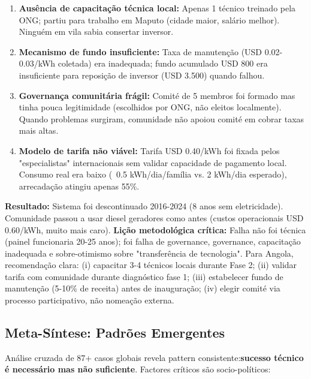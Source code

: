 \documentclass[12pt, a4paper]{article}
\begin{document}
\begin{enumerate}
\item\textbf{Ausência de capacitação técnica local:} Apenas 1 técnico treinado pela ONG; partiu para trabalho em Maputo (cidade maior, salário melhor). Ninguém em vila sabia consertar inversor.
\item\textbf{Mecanismo de fundo insuficiente:} Taxa de manutenção (USD 0.02-0.03/kWh coletada) era inadequada; fundo acumulado USD 800 era insuficiente para reposição de inversor (USD 3.500) quando falhou.
\item\textbf{Governança comunitária frágil:} Comité de 5 membros foi formado mas tinha pouca legitimidade (escolhidos por ONG, não eleitos localmente). Quando problemas surgiram, comunidade não apoiou comité em cobrar taxas mais altas.
\item\textbf{Modelo de tarifa não viável:} Tarifa USD 0.40/kWh foi fixada pelos "especialistas" internacionais sem validar capacidade de pagamento local. Consumo real era baixo (~0.5 kWh/dia/família vs. 2 kWh/dia esperado), arrecadação atingiu apenas 55\%.
\end{enumerate}
\textbf{Resultado:} Sistema foi descontinuado 2016-2024 (8 anos sem eletricidade). Comunidade passou a usar diesel geradores como antes (custos operacionais USD 0.60/kWh, muito mais caro).
\textbf{Lição metodológica crítica:} Falha não foi técnica (painel funcionaria 20-25 anos); foi falha de governance, governance, capacitação inadequada e sobre-otimismo sobre "transferência de tecnologia". Para Angola, recomendação clara: (i) capacitar 3-4 técnicos locais durante Fase 2; (ii) validar tarifa com comunidade durante diagnóstico fase 1; (iii) estabelecer fundo de manutenção (5-10\% de receita) antes de inauguração; (iv) elegir comité via processo participativo, não nomeação externa.

\subsection{Meta-Síntese: Padrões Emergentes}

Análise cruzada de 87+ casos globais revela pattern consistente:\textbf{sucesso técnico é necessário mas não suficiente}. Factores críticos são socio-políticos:
\end{document}
